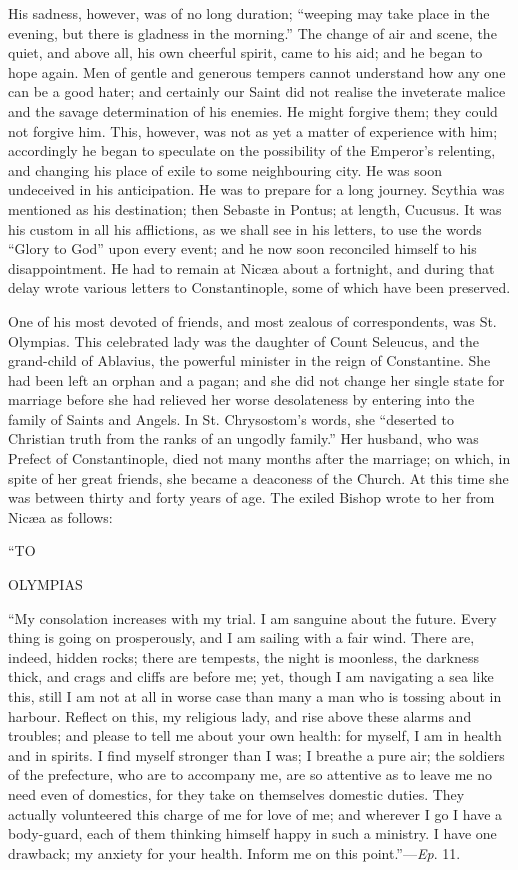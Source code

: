 His sadness, however, was of no long duration; ``weeping may
take place in the evening, but there is gladness in the morning.''
The change of air and scene, the quiet, and above all, his own
cheerful spirit, came to his aid; and he began to hope again. Men of
gentle and generous tempers cannot understand how any one can be a
good hater; and certainly our Saint did not realise the inveterate
malice and the savage determination of his enemies. He might forgive
them; they could not forgive him. This, however, was not as yet a
matter of experience with him; accordingly he began to speculate on
the possibility of the Emperor's relenting, and changing his place of
exile to some neighbouring city. He was soon undeceived in his
anticipation. He was to prepare for a long journey. Scythia was
mentioned as his destination; then Sebaste in Pontus; at length,
Cucusus. It was his custom in all his afflictions, as we shall
see in his letters, to use the words ``Glory to God'' upon
every event; and he now soon reconciled himself to his disappointment.
He had to remain at Nicæa about a fortnight, and during that delay
wrote various letters to Constantinople, some of which have been
preserved.

One of his most devoted of friends, and most zealous of
correspondents, was St. Olympias. This celebrated lady was the
daughter of Count Seleucus, and the grand-child of Ablavius, the
powerful minister in the reign of Constantine. She had been left an
orphan and a pagan; and she did not change her single state for
marriage before she had relieved her worse desolateness by entering
into the family of Saints and Angels. In St. Chrysostom's words, she
``deserted to Christian truth from the ranks of an ungodly
family.'' Her husband, who was Prefect of Constantinople, died not
many months after the marriage; on which, in spite of her great
friends, she became a deaconess of the Church. At this time she was
between thirty and forty years of age. The exiled Bishop wrote to her
from Nicæa as follows:

``TO

OLYMPIAS

``My consolation increases with my trial. I am sanguine about
the future. Every thing is going on prosperously, and I am sailing
with a fair wind. There are, indeed, hidden rocks; there are tempests,
the night is moonless, the darkness thick, and crags and cliffs are
before me; yet, though I am navigating a sea like this, still I am not
at all in worse case than many a man who is tossing about in harbour.
Reflect on this, my religious lady, and rise above these alarms and
troubles; and please to tell me about your own health: for myself, I
am in health and in spirits. I find myself stronger than I was; I
breathe a pure air; the soldiers of the prefecture, who are to
accompany me, are so attentive as to leave me no need even of
domestics, for they take on themselves domestic duties.
They actually volunteered this charge of me for love of me; and
wherever I go I have a body-guard, each of them thinking himself happy
in such a ministry. I have one drawback; my anxiety for your health.
Inform me on this point.''—\emph{Ep}. 11.

